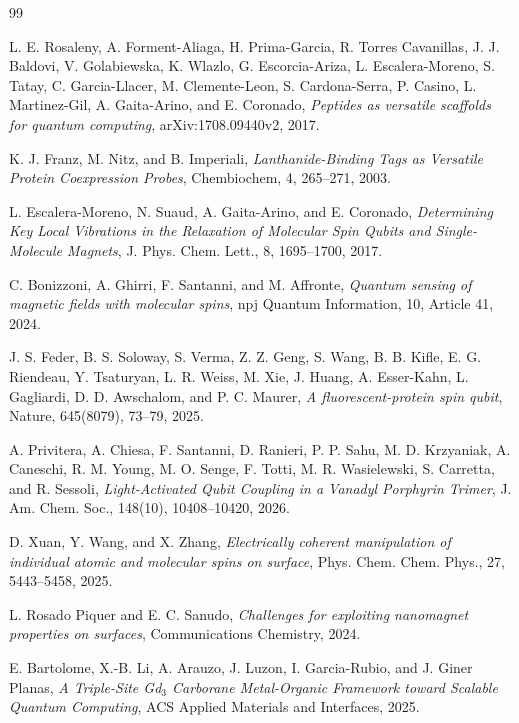 \documentclass[11pt]{report}
\theoremstyle{definition}
\begin{document}
\begin{thebibliography}{99}

L. E. Rosaleny, A. Forment-Aliaga, H. Prima-Garcia, R. Torres Cavanillas, J. J. Baldovi, V. Golabiewska, K. Wlazlo, G. Escorcia-Ariza, L. Escalera-Moreno, S. Tatay, C. Garcia-Llacer, M. Clemente-Leon, S. Cardona-Serra, P. Casino, L. Martinez-Gil, A. Gaita-Arino, and E. Coronado,
\emph{Peptides as versatile scaffolds for quantum computing},
arXiv:1708.09440v2, 2017.

K. J. Franz, M. Nitz, and B. Imperiali,
\emph{Lanthanide-Binding Tags as Versatile Protein Coexpression Probes},
Chembiochem, 4, 265--271, 2003.

L. Escalera-Moreno, N. Suaud, A. Gaita-Arino, and E. Coronado,
\emph{Determining Key Local Vibrations in the Relaxation of Molecular Spin Qubits and Single-Molecule Magnets},
J. Phys. Chem. Lett., 8, 1695--1700, 2017.

C. Bonizzoni, A. Ghirri, F. Santanni, and M. Affronte,
\emph{Quantum sensing of magnetic fields with molecular spins},
npj Quantum Information, 10, Article 41, 2024.

J. S. Feder, B. S. Soloway, S. Verma, Z. Z. Geng, S. Wang, B. B. Kifle, E. G. Riendeau, Y. Tsaturyan, L. R. Weiss, M. Xie, J. Huang, A. Esser-Kahn, L. Gagliardi, D. D. Awschalom, and P. C. Maurer,
\emph{A fluorescent-protein spin qubit},
Nature, 645(8079), 73--79, 2025.

A. Privitera, A. Chiesa, F. Santanni, D. Ranieri, P. P. Sahu, M. D. Krzyaniak, A. Caneschi, R. M. Young, M. O. Senge, F. Totti, M. R. Wasielewski, S. Carretta, and R. Sessoli,
\emph{Light-Activated Qubit Coupling in a Vanadyl Porphyrin Trimer},
J. Am. Chem. Soc., 148(10), 10408--10420, 2026.

D. Xuan, Y. Wang, and X. Zhang,
\emph{Electrically coherent manipulation of individual atomic and molecular spins on surface},
Phys. Chem. Chem. Phys., 27, 5443--5458, 2025.

L. Rosado Piquer and E. C. Sanudo,
\emph{Challenges for exploiting nanomagnet properties on surfaces},
Communications Chemistry, 2024.

E. Bartolome, X.-B. Li, A. Arauzo, J. Luzon, I. Garcia-Rubio, and J. Giner Planas,
\emph{A Triple-Site Gd$_3$ Carborane Metal-Organic Framework toward Scalable Quantum Computing},
ACS Applied Materials and Interfaces, 2025.


\end{thebibliography}
\end{document}
